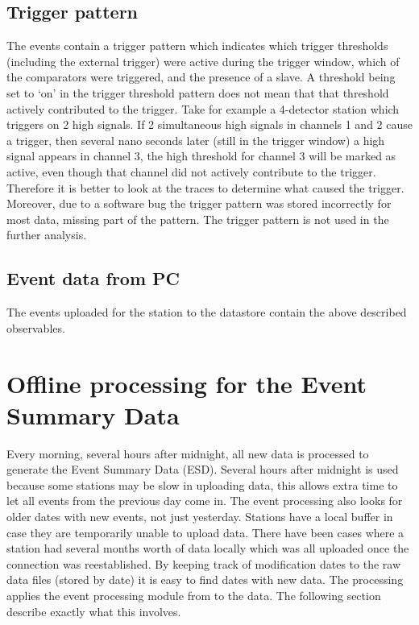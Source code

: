 \subsection{Trigger pattern}

The \hisparc events contain a trigger pattern which indicates which trigger thresholds (including the external trigger) were active during the trigger window, which of the comparators were triggered, and the presence of a slave. A threshold being set to `on' in the trigger threshold pattern does not mean that that threshold actively contributed to the trigger. Take for example a 4-detector station which triggers on 2 high signals. If 2 simultaneous high signals in channels 1 and 2 cause a trigger, then several nano seconds later (still in the trigger window) a high signal appears in channel 3, the high threshold for channel 3 will be marked as active, even though that channel did not actively contribute to the trigger. Therefore it is better to look at the traces to determine what caused the trigger. Moreover, due to a software bug the trigger pattern was stored incorrectly for most data, missing part of the pattern. The trigger pattern is not used in the further analysis.


\subsection{Event data from PC}

The events uploaded for the station to the datastore contain the above described observables.


\section{Offline processing for the Event Summary Data}

Every morning, several hours after midnight, all new data is processed to generate the Event Summary Data (ESD). Several hours after midnight is used because some stations may be slow in uploading data, this allows extra time to let all events from the previous day come in.  The event processing also looks for older dates with new events, not just yesterday. Stations have a local buffer in case they are temporarily unable to upload data. There have been cases where a station had several months worth of data locally which was all uploaded once the connection was reestablished. By keeping track of modification dates to the raw data files (stored by date) it is easy to find dates with new data. The processing applies the event processing module from \sapphire to the data. The following section describe exactly what this involves.

